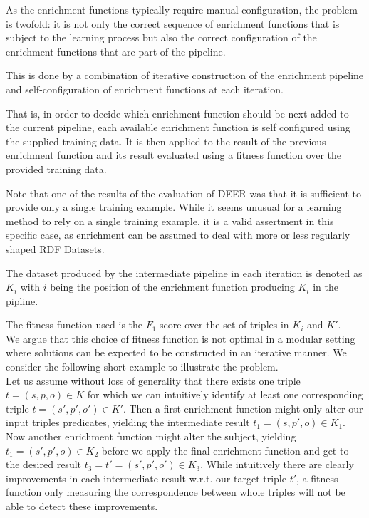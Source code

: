As the enrichment functions typically require manual configuration, the problem is twofold: it is not only the correct sequence of enrichment functions that is subject to the learning process but also the correct configuration of the enrichment functions that are part of the pipeline.

This is done by a combination of iterative construction of the enrichment pipeline and self-configuration of enrichment functions at each iteration.

That is, in order to decide which enrichment function should be next added to the current pipeline, each available enrichment function is self configured using the supplied training data.
It is then applied to the result of the previous enrichment function and its result evaluated using a fitness function over the provided training data.

Note that one of the results of the evaluation of \ac{DEER} was that it is sufficient to provide only a single training example.
While it seems unusual for a learning method to rely on a single training example, it is a valid assertment in this specific case, as enrichment can be assumed to deal with more or less regularly shaped \ac{RDF} Datasets.

The dataset produced by the intermediate pipeline in each iteration is denoted as $K_i$ with $i$ being the position of the enrichment function producing $K_i$ in the pipline.

The fitness function used is the $F_1$-score\cite{sasaki:ttm2007a} over the set of triples in $K_i$ and $K'$.\\

We argue that this choice of fitness function is not optimal in a modular setting where solutions can be expected to be constructed in an iterative manner.
We consider the following short example to illustrate the problem. \\

Let us assume without loss of generality that there exists one triple $t=(s,p,o)\in K$ for which we can intuitively identify at least one corresponding triple $t=(s',p',o')\in K'$.
Then a first enrichment function might only alter our input triples predicates, yielding the intermediate result $t_1=(s,p',o)\in K_1$. Now another enrichment function might alter the subject, yielding $t_1=(s',p',o)\in K_2$ before we apply the final enrichment function and get to the desired result $t_3=t'=(s',p',o')\in K_3$.
While intuitively there are clearly improvements in each intermediate result w.r.t. our target triple $t'$, a fitness function only measuring the correspondence between whole triples will not be able to detect these improvements.\\

